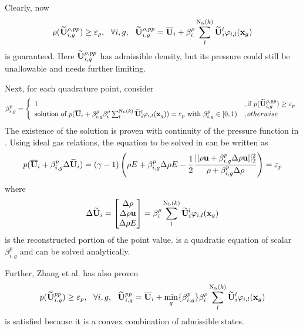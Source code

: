 Clearly, now
\begin{equation}
    \rho(\Ulim_{i,g}^{\rho,pp})\geq\varepsilon_\rho,\ \
    \forall i,g,\ \
    \Ulim_{i,g}^{\rho,pp} = \uu_{i} + \beta_{i}^\rho \sum_{l}^{\mathrm{N_b}(k)}{\Ulim_i^l\varphi_{i,l}(\x_g)}
\end{equation}
is guaranteed.
Here $\widetilde{\mathbf{U}}_{i,g}^{\rho,pp}$ has admissible density,
but its pressure could still be unallowable and needs further limiting.

Next, for each quadrature point, consider
\begin{equation}
    \label{eq:point-beta}
    \beta_{i,g}^p = \left\{
    \begin{array}{ll}
        1                                   & ,\text{if } p(\widetilde{\mathbf{U}}_{i,g}^{\rho,pp}) \geq \varepsilon_p \\
        \text{solution of }
        p(\overline{\mathbf{U}}_{i} + \beta_{i,g}^p\beta_{i}^\rho \sum_{l}^{\mathrm{N_b}(k)}{\widetilde{\mathbf{U}}_i^l\varphi_{i,l}(\mathbf{x}_g)}) = \varepsilon_p
        \text{ with } \beta_{i,g}^p\in[0,1) & , otherwise
    \end{array}
    \right.
\end{equation}
The existence of the solution is proven with continuity of the pressure function in \cite{zhang2010positivity}.
Using ideal gas relations, the equation to be solved in  can be written as
\begin{equation}
    \label{eq:p-beta-function-sol}
    p(\overline{\mathbf{U}}_{i}+\beta_{i,g}^p\mathrm\Delta \widetilde{\mathbf{U}}_{i}) = (\gamma - 1) \left(
    \rho E + \beta_{i,g}^p\mathrm\Delta \rho E - \frac{1}{2}
    \frac{||\rho \mathbf{u} + \beta_{i,g}^p\mathrm\Delta\rho\mathbf{u}||_2^2}
    {\rho + \beta_{i,g}^p\mathrm\Delta\rho}
    \right) = \varepsilon_p
\end{equation}
where
$$
    \mathrm\Delta \widetilde{\mathbf{U}}_{i} = \begin{bmatrix}
        \mathrm\Delta \rho \\ \mathrm\Delta\rho\mathbf{u} \\ \mathrm\Delta \rho E
    \end{bmatrix} = \beta_{i}^\rho \sum_{l}^{\mathrm{N_b}(k)}{\widetilde{\mathbf{U}}_i^l\varphi_{i,l}(\mathbf{x}_g)}
$$
is the reconstructed portion of the point value.
 is a quadratic equation of scalar $\beta_{i,g}^p$
and can be solved analytically.

Further, Zhang et al. \cite{zhang2010positivity} has also proven
\begin{equation}
    p(\widetilde{\mathbf{U}}_{i,g}^{pp}) \geq \varepsilon_p,\ \
    \forall i,g,\ \
    \widetilde{\mathbf{U}}_{i,g}^{pp} = \overline{\mathbf{U}}_{i} + \min_g\{\beta_{i,g}^p\}\beta_{i}^\rho \sum_{l}^{\mathrm{N_b}(k)}{\widetilde{\mathbf{U}}_i^l\varphi_{i,l}(\mathbf{x}_g)}
\end{equation}
is satisfied because it is a convex combination of admissible states.

